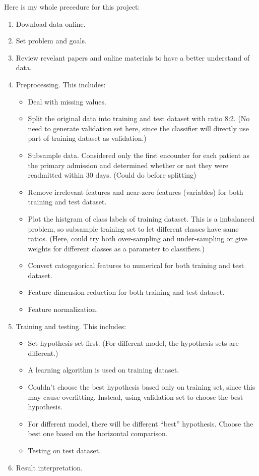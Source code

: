 \documentclass[]{article}
\begin{document}
Here is my whole precedure for this project:

\begin{enumerate}
\def\labelenumi{\arabic{enumi}.}
\itemsep1pt\parskip0pt
\item
  Download data online.
\item
  Set problem and goals.
\item
  Review revelant papers and online materials to have a better
  understand of data.
\item
  Preprocessing. This includes:

  \begin{itemize}
  \itemsep1pt\parskip0pt
  \item
    Deal with missing values.
  \item
    Split the original data into training and test dataset with ratio
    8:2. (No need to generate validation set here, since the classifier
    will directly use part of training dataset as validation.)
  \item
    Subsample data. Considered only the first encounter for each patient
    as the primary admission and determined whether or not they were
    readmitted within 30 days. (Could do before splitting)
  \item
    Remove irrelevant features and near-zero features (variables) for
    both training and test dataset.
  \item
    Plot the histgram of class labels of training dataset. This is a
    imbalanced problem, so subsample training set to let different
    classes have same ratios. (Here, could try both over-sampling and
    under-sampling or give weights for different classes as a parameter
    to classifiers.)
  \item
    Convert catogegorical features to numerical for both training and
    test dataset.
  \item
    Feature dimension reduction for both training and test dataset.
  \item
    Feature normalization.
  \end{itemize}
\item
  Training and testing. This includes:

  \begin{itemize}
  \itemsep1pt\parskip0pt
  \item
    Set hypothesis set first. (For different model, the hypothesis sets
    are different.)
  \item
    A learning algorithm is used on training dataset.
  \item
    Couldn't choose the best hypothesis based only on training set,
    since this may cause overfitting. Instead, using validation set to
    choose the best hypothesis.
  \item
    For different model, there will be different ``best'' hypothesis.
    Choose the best one based on the horizontal comparison.
  \item
    Testing on test dataset.
  \end{itemize}
\item
  Result interpretation.
\end{enumerate}
\end{document}

